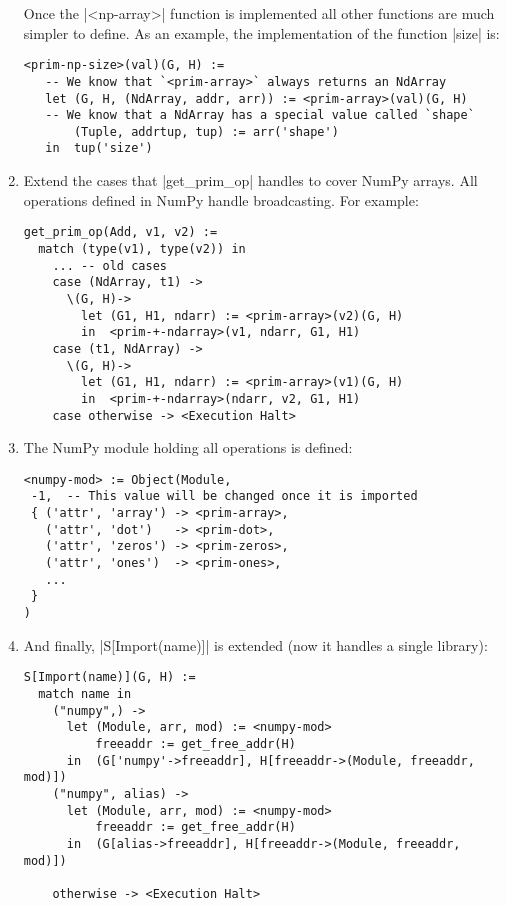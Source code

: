 \begin{enumerate}
  Once the \pycode|<np-array>| function is
  implemented all other functions are much simpler to define. As an
  example, the implementation of the function \pycode|size| is:

\begin{verbatim}
<prim-np-size>(val)(G, H) :=
   -- We know that `<prim-array>` always returns an NdArray
   let (G, H, (NdArray, addr, arr)) := <prim-array>(val)(G, H)
   -- We know that a NdArray has a special value called `shape`
       (Tuple, addrtup, tup) := arr('shape')
   in  tup('size')
\end{verbatim}
\item
  Extend the cases that \pycode|get_prim_op| handles to cover NumPy
  arrays. All operations defined in NumPy handle broadcasting.
  For example:

\begin{verbatim}
get_prim_op(Add, v1, v2) :=
  match (type(v1), type(v2)) in
    ... -- old cases
    case (NdArray, t1) ->
      \(G, H)->
        let (G1, H1, ndarr) := <prim-array>(v2)(G, H)
        in  <prim-+-ndarray>(v1, ndarr, G1, H1)
    case (t1, NdArray) ->
      \(G, H)->
        let (G1, H1, ndarr) := <prim-array>(v1)(G, H)
        in  <prim-+-ndarray>(ndarr, v2, G1, H1)
    case otherwise -> <Execution Halt>
\end{verbatim}
\item
  The NumPy module holding all operations is defined:

\begin{verbatim}
<numpy-mod> := Object(Module,
 -1,  -- This value will be changed once it is imported
 { ('attr', 'array') -> <prim-array>,
   ('attr', 'dot')   -> <prim-dot>,
   ('attr', 'zeros') -> <prim-zeros>,
   ('attr', 'ones')  -> <prim-ones>,
   ...
 }
)
\end{verbatim}
\item
  And finally, \pycode|S[Import(name)]| is extended (now it handles
  a single library):

\begin{verbatim}
S[Import(name)](G, H) :=
  match name in
    ("numpy",) ->
      let (Module, arr, mod) := <numpy-mod>
          freeaddr := get_free_addr(H)
      in  (G['numpy'->freeaddr], H[freeaddr->(Module, freeaddr, mod)])
    ("numpy", alias) ->
      let (Module, arr, mod) := <numpy-mod>
          freeaddr := get_free_addr(H)
      in  (G[alias->freeaddr], H[freeaddr->(Module, freeaddr, mod)])

    otherwise -> <Execution Halt>
\end{verbatim}
\end{enumerate}


